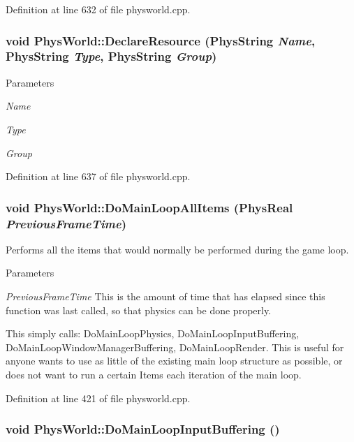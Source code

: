 Definition at line 632 of file physworld.cpp.\hypertarget{classPhysWorld_a908c21f7f5452f8d7c6d4b5b2308ba5e}{
\subsubsection[{DeclareResource}]{\setlength{\rightskip}{0pt plus 5cm}void PhysWorld::DeclareResource (PhysString {\em Name}, \/  PhysString {\em Type}, \/  PhysString {\em Group})}}
\label{db/df5/classPhysWorld_a908c21f7f5452f8d7c6d4b5b2308ba5e}

\begin{DoxyParams}{Parameters}
\item[{\em Name}]\item[{\em Type}]\item[{\em Group}]\end{DoxyParams}


Definition at line 637 of file physworld.cpp.\hypertarget{classPhysWorld_a174da29a119080c44ba628cb25918f8c}{
\subsubsection[{DoMainLoopAllItems}]{\setlength{\rightskip}{0pt plus 5cm}void PhysWorld::DoMainLoopAllItems (PhysReal {\em PreviousFrameTime})}}
\label{db/df5/classPhysWorld_a174da29a119080c44ba628cb25918f8c}


Performs all the items that would normally be performed during the game loop. 
\begin{DoxyParams}{Parameters}
\item[{\em PreviousFrameTime}]This is the amount of time that has elapsed since this function was last called, so that physics can be done properly.\end{DoxyParams}
This simply calls: DoMainLoopPhysics, DoMainLoopInputBuffering, DoMainLoopWindowManagerBuffering, DoMainLoopRender. This is useful for anyone wants to use as little of the existing main loop structure as possible, or does not want to run a certain Items each iteration of the main loop. 

Definition at line 421 of file physworld.cpp.\hypertarget{classPhysWorld_a81b3f0dcc0a90d039623f696343e6e9c}{
\subsubsection[{DoMainLoopInputBuffering}]{\setlength{\rightskip}{0pt plus 5cm}void PhysWorld::DoMainLoopInputBuffering ()}}
\label{db/df5/classPhysWorld_a81b3f0dcc0a90d039623f696343e6e9c}


